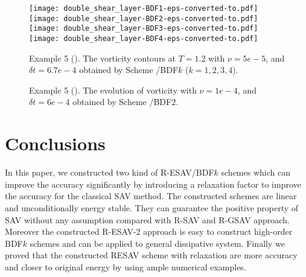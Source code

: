 \documentclass[final,review,onefignum,onetabnum]{siamart190516}
\theoremstyle{plain}
\begin{document}
\begin{figure}[!h]
	\centering
	\texttt{[image: double\_shear\_layer-BDF1-eps-converted-to.pdf]}
	\texttt{[image: double\_shear\_layer-BDF2-eps-converted-to.pdf]}\\
	\texttt{[image: double\_shear\_layer-BDF3-eps-converted-to.pdf]}
	\texttt{[image: double\_shear\_layer-BDF4-eps-converted-to.pdf]}
	\caption{Example 5 (). The vorticity contours at $T = 1.2$ with $\nu  = 5e-5$, and
		$\delta t = 6.7 e- 4$ obtained by Scheme \uppercase\expandafter{}/BDF$k$ ($k=1, 2, 3, 4$).}
	\label{Fig:NS-double-shear-RESAV2-periodic-scheme-comparison}
\end{figure} 


\begin{figure}[!h]
\centering
{} 
\label{Fig:NS-double-shear-RESAV2-periodic-evolution}
\caption{Example 5 (). The evolution of vorticity with $\nu  = 1e-4$, and $\delta t = 6e- 4$ obtained by Scheme \uppercase\expandafter{}/BDF$2$.}
\end{figure}


 
\section{Conclusions}
\label{sec:conclusion}
In this paper, we constructed two kind of R-ESAV/BDF$k$ schemes which can improve the accuracy significantly by introducing a relaxation factor to improve the accuracy for the classical SAV method. The constructed schemes are linear and unconditionally energy stable. They can guarantee the positive property of SAV without any assumption compared with R-SAV and R-GSAV approach. Moreover  the constructed R-ESAV-2 approach is easy to construct high-order BDF$k$ schemes and can be applied to general dissipative system. Finally we proved that the constructed RESAV scheme with relaxation are more accuracy and closer to original energy by using ample numerical examples.



\clearpage

%

\end{document}

